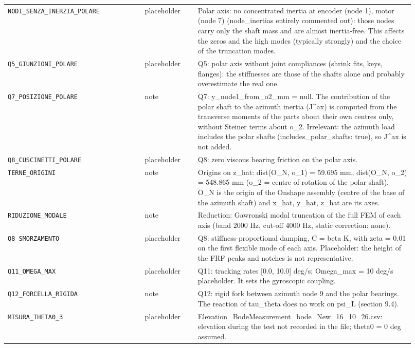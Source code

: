 \documentclass[10pt,a4paper]{article}
\numberwithin{equation}{section}
\begin{document}
\begin{longtable}{p{0.31\linewidth}p{0.12\linewidth}p{0.49\linewidth}}
\texttt{NODI\_SENZA\_INERZIA\_POLARE} & placeholder & Polar axis: no concentrated inertia at encoder (node 1), motor (node 7) (node\_inertias entirely commented out): those nodes carry only the shaft mass and are almost inertia-free. This affects the zeros and the high modes (typically strongly) and the choice of the truncation modes. \\
\texttt{Q5\_GIUNZIONI\_POLARE} & placeholder & Q5: polar axis without joint compliances (shrink fits, keys, flanges): the stiffnesses are those of the shafts alone and probably overestimate the real one. \\
\texttt{Q7\_POSIZIONE\_POLARE} & note & Q7: y\_node1\_from\_o2\_mm = null. The contribution of the polar shaft to the azimuth inertia (J\^{}ax) is computed from the transverse moments of the parts about their own centres only, without Steiner terms about o\_2. Irrelevant: the azimuth load includes the polar shafts (includes\_polar\_shafts: true), so J\^{}ax is not added. \\
\texttt{Q8\_CUSCINETTI\_POLARE} & placeholder & Q8: zero viscous bearing friction on the polar axis. \\
\texttt{TERNE\_ORIGINI} & note & Origins on z\_hat: dist(O\_N, o\_1) = 59.695 mm, dist(O\_N, o\_2) = 548.865 mm (o\_2 = centre of rotation of the polar shaft). O\_N is the origin of the Onshape assembly (centre of the base of the azimuth shaft) and x\_hat, y\_hat, z\_hat are its axes. \\
\texttt{RIDUZIONE\_MODALE} & note & Reduction: Gawronski modal truncation of the full FEM of each axis (band 2000 Hz, cut-off 4000 Hz, static correction: none). \\
\texttt{Q8\_SMORZAMENTO} & placeholder & Q8: stiffness-proportional damping, C = beta K, with zeta = 0.01 on the first flexible mode of each axis. Placeholder: the height of the FRF peaks and notches is not representative. \\
\texttt{Q11\_OMEGA\_MAX} & placeholder & Q11: tracking rates [0.0, 10.0] deg/s; Omega\_max = 10 deg/s placeholder. It sets the gyroscopic coupling. \\
\texttt{Q12\_FORCELLA\_RIGIDA} & note & Q12: rigid fork between azimuth node 9 and the polar bearings. The reaction of tau\_theta does no work on psi\_L (section 9.4). \\
\texttt{MISURA\_THETA0\_3} & placeholder & Elevation\_BodeMeasurement\_bode\_New\_16\_10\_26.csv: elevation during the test not recorded in the file; theta0 = 0 deg assumed. \\

\end{longtable}
\end{document}
